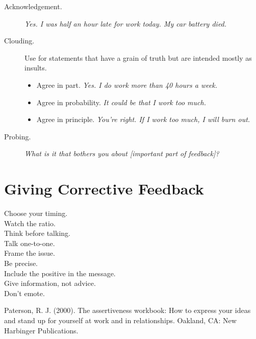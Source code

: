 \documentclass{article}
\begin{document}
\begin{multicols}{3}
         \begin{description}
             \item[Acknowledgement.] \emph{Yes. I was half an hour late for work today. My car battery died.}
             \item[Clouding.] Use for statements that have a grain of truth but are intended mostly as insults.
                 \begin{itemize}
                     \item Agree in part. \emph{Yes. I do work more than 40 hours a week.}
                     \item Agree in probability. \emph{It could be that I work too much.}
                     \item Agree in principle. \emph{You're right. If I work too much, I will burn out.}
                 \end{itemize}
             \item[Probing.] \emph{What is it that bothers you about [important part of feedback]?}
         \end{description}
 
	\section*{Giving Corrective Feedback}

        \begin{description}
            \item[Choose your timing.]
            \item[Watch the ratio.]
            \item[Think before talking.]
            \item[Talk one-to-one.]
            \item[Frame the issue.]
            \item[Be precise.]
            \item[Include the positive in the message.]
            \item[Give information, not advice.]
            \item[Don't emote.]
        \end{description}

\end{multicols}


Paterson, R. J. (2000). The assertiveness workbook: How to express your ideas and stand up for yourself at work and in relationships. Oakland, CA: New Harbinger Publications.
\end{document}
